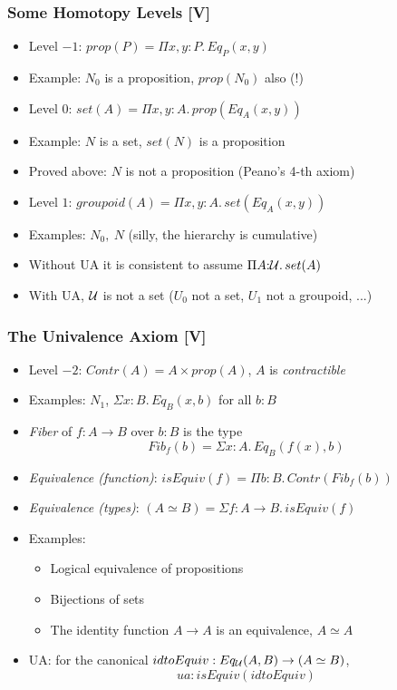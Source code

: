 \documentclass[handout]{beamer}
\newcommand{\depi}[3]{\Pi{#1{:}#2.\,#3}}
\newcommand{\sigm}[3]{\Sigma{#1{:}#2.\,#3}}
\newcommand{\UU}{{\cal U}}
\begin{document}
  
 \frame
  {
  
    \frametitle{Some Homotopy Levels [V]}

    \begin{itemize}[<+->]
    \item Level $-1$: $prop(P) = \depi{x,y}{P}{Eq_P(x,y)}$
    \item Example: $N_0$ is a proposition, $prop(N_0)$ also (!)
    \item Level $0$: $set(A) = \depi{x,y}{A}{prop(Eq_A(x,y))}$
    \item Example: $N$ is a set, $set(N)$ is a proposition
    \item Proved above: $N$ is not a proposition (Peano's 4-th axiom)
    \item Level $1$: $groupoid(A) = \depi{x,y}{A}{set(Eq_A(x,y))}$
    \item Examples: $N_0,~N$ (silly, the hierarchy is cumulative)
    \item Without UA it is consistent to assume $\depi{A}{\UU}{set(A)}$
    \item With UA, $\UU$ is not a set ($U_0$ not a set, $U_1$ not a groupoid, ...)
    \end{itemize}
  }

 \frame
  {
  
    \frametitle{The Univalence Axiom [V]}

    \begin{itemize}[<+->]
    \item Level $-2$: $Contr(A) = A \times prop(A)$, $A$ is \emph{contractible}
    \item Examples: $N_1$, $\sigm{x}{B}{Eq_B(x,b)}$ for all $b:B$
    \item \emph{Fiber} of $f:A\to B$ over $b:B$ is the type
    \[Fib_f (b) = \sigm{x}{A}{Eq_B(f(x),b)}\]
    \item \emph{Equivalence (function)}: $isEquiv(f) = \depi{b}{B}{Contr(Fib_f (b))}$
    \item \emph{Equivalence (types)}: 
    $(A\simeq B) = \sigm{f}{A\to B}{isEquiv(f)}$
    \item Examples:
      \begin{itemize}[<+->]
      \item Logical equivalence of propositions
      \item Bijections of sets
      \item The identity function $A\to A$ is an equivalence, $A\simeq A$
      \end{itemize}
    \item UA:  for the canonical $idtoEquiv: Eq_{\UU}(A,B) \to (A\simeq B)$,
                                    \[ua : isEquiv(idtoEquiv)\] 
    \end{itemize}
  }
\end{document}
